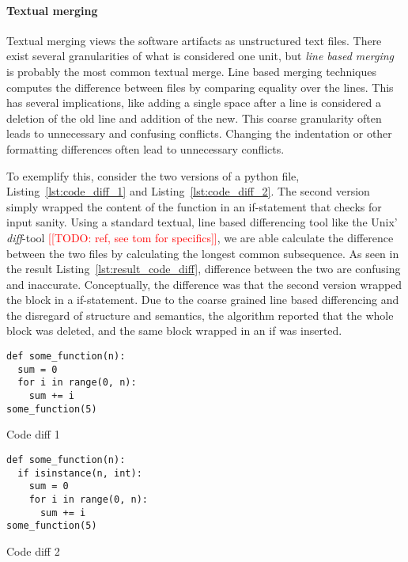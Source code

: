 \documentclass[a4paper,english]{ifimaster}
\newcommand{\todo}[1]{\textcolor{red}{[[TODO: #1]]}\PackageWarning{TODO:}{#1!}}
\begin{document}
\paragraph{Textual merging}%
\label{par:textual_merging}

Textual merging views the software artifacts as unstructured text files. There exist several granularities of what is considered one unit, but \textit{line based merging} is probably the most common textual merge. Line based merging techniques computes the difference between files by comparing equality over the lines. This has several implications, like adding a single space after a line is considered a deletion of the old line and addition of the new. This coarse granularity often leads to unnecessary and confusing conflicts. Changing the indentation or other formatting differences often lead to unnecessary conflicts.

To exemplify this, consider the two versions of a python file, Listing~\ref{lst:code_diff_1} and Listing~\ref{lst:code_diff_2}. The second version simply wrapped the content of the function in an if-statement that checks for input sanity. Using a standard textual, line based differencing tool like the Unix' \textit{diff}-tool \todo{ref, see tom for specifics}, we are able calculate the difference between the two files by calculating the longest common subsequence. As seen in the result Listing~\ref{lst:result_code_diff}, difference between the two are confusing and inaccurate. Conceptually, the difference was that the second version wrapped the block in a if-statement. Due to the coarse grained line based differencing and the disregard of structure and semantics, the algorithm reported that the whole block was deleted, and the same block wrapped in an if was inserted.

\begin{listing}
	\begin{verbatim}
def some_function(n):
  sum = 0
  for i in range(0, n):
    sum += i
some_function(5)

  \end{verbatim}
	\caption{Code diff 1}
	\label{lst:code_diff_1}
\end{listing}

\begin{listing}
	\begin{verbatim}
def some_function(n):
  if isinstance(n, int):
    sum = 0
    for i in range(0, n):
      sum += i
some_function(5)
  \end{verbatim}
	\caption{Code diff 2}
	\label{lst:code_diff_2}
\end{listing}
\end{document}
